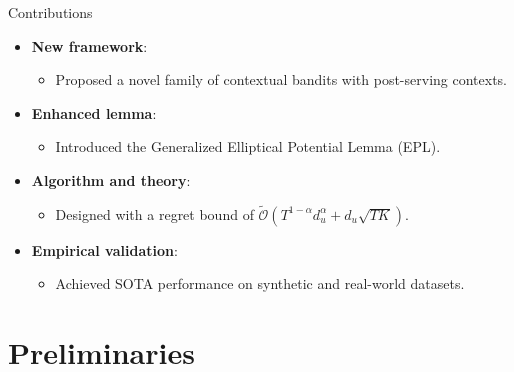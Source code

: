 \documentclass[10pt, xcolor={dvipsnames,x11names},compress]{beamer}
\begin{document}
\begin{frame}{Contributions}
\begin{itemize}
    \item \textbf{New framework}: 
    \begin{itemize}
        \item Proposed a novel family of contextual bandits with post-serving contexts.
    \end{itemize}
    \item \textbf{Enhanced lemma}: 
    \begin{itemize}
        \item Introduced the Generalized Elliptical Potential Lemma (EPL).
    \end{itemize}
    \item \textbf{Algorithm and theory}: 
    \begin{itemize}
        \item Designed \textbf{\polinucb} with a regret bound of \( \widetilde{\mathcal{O}}(T^{1-\alpha}d_u^{\alpha} + d_u\sqrt{T K })\).
    \end{itemize}
    \item \textbf{Empirical validation}: 
    \begin{itemize}
        \item Achieved SOTA performance on synthetic and real-world datasets.
    \end{itemize}
\end{itemize}


\end{frame}




\section{Preliminaries}


\end{document}
